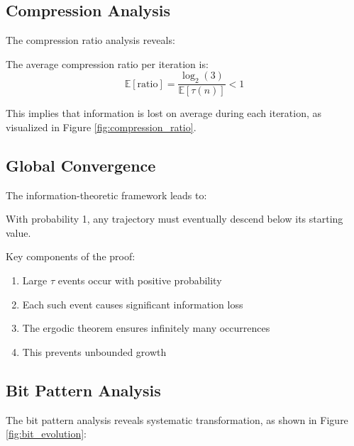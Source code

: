 \subsection{Compression Analysis}

The compression ratio analysis reveals:

\begin{theorem}\label{thm:compression_ratio}
The average compression ratio per iteration is:
\[
\mathbb{E}[\text{ratio}] = \frac{\log_2(3)}{\mathbb{E}[\tau(n)]} < 1
\]
\end{theorem}

This implies that information is lost on average during each iteration, as visualized in Figure \ref{fig:compression_ratio}.

\subsection{Global Convergence}

The information-theoretic framework leads to:

\begin{theorem}\label{thm:global_descent}
With probability 1, any trajectory must eventually descend below its starting value.
\end{theorem}

Key components of the proof:
\begin{enumerate}
\item Large $\tau$ events occur with positive probability
\item Each such event causes significant information loss
\item The ergodic theorem ensures infinitely many occurrences
\item This prevents unbounded growth
\end{enumerate}

\subsection{Bit Pattern Analysis}

The bit pattern analysis reveals systematic transformation, as shown in Figure \ref{fig:bit_evolution}:

